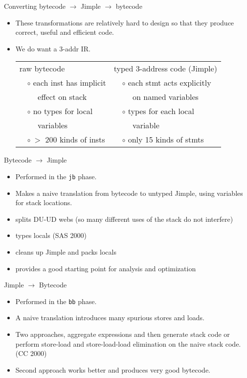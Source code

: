 \begin{slide}{Converting bytecode $\rightarrow$ Jimple $\rightarrow$ bytecode}
\begin{small}
\begin{itemize}
\item These transformations are relatively hard to design so that 
they produce correct, useful and efficient code.
\item We do want a 3-addr IR.
\begin{footnotesize}
\begin{tabular}{ll|ll}
\multicolumn{2}{l}{raw bytecode \hspace*{.7 in}} & \multicolumn{2}{l}{typed 3-address code (Jimple)}\\
& { $\circ$ each inst has implicit} & &{ $\circ$ each stmt acts explicitly} \\
& { $\quad $ effect on stack} & & { $\quad $ on named variables} \\
& { $\circ$ no types for local}  & & { $\circ$ types for each local} \\
& { $\quad$ variables}& & { $\quad $ variable} \\
& { $\circ \ >$ 200 kinds of insts} && { $\circ$ only 15 kinds of stmts} 
\end{tabular}
\end{footnotesize}
\end{itemize}
\end{small}
\end{slide}

\begin{slide} {Bytecode $\rightarrow$ Jimple}
\begin{itemize}
\item Performed in the \texttt{jb} phase.
\item Makes a naive translation from bytecode to untyped Jimple,
      using variables for stack locations.
\item splits DU-UD webs (so many different uses of the stack do not
      interfere)
\item types locals (SAS 2000)
\item cleans up Jimple and packs locals
\item provides a good starting point for analysis and optimization
\end{itemize}
\end{slide}

\begin{slide} {Jimple $\rightarrow$ Bytecode}
\begin{itemize}
\item Performed in the \texttt{bb} phase.
\item A naive translation introduces many spurious stores and loads.
\item Two approaches,  aggregate expressions and then generate stack
      code or perform store-load and store-load-load elimination 
      on the naive stack code. (CC 2000)
\item Second approach works better and produces very good bytecode.
\end{itemize}
\end{slide}

